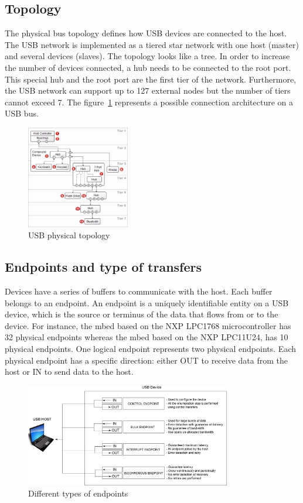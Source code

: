 \documentclass[pdftex,10pt,a4paper]{report}
\begin{document}
\subsection{Topology}
The physical bus topology defines how USB devices are connected to the host. The USB network is implemented as a tiered star network with one host (master) and several devices (slaves). The topology looks like a tree. In order to increase the number of devices connected, a hub needs to be connected to the root port. This special hub and the root port are the first tier of the network. Furthermore, the USB network can support up to 127 external nodes but the number of tiers cannot exceed 7. The figure~\ref{USB physical topology} represents a possible connection architecture on a USB bus.


\begin{figure}[h!]
		\centering
		\includegraphics[width=0.4\textwidth]{./usb_topology.jpg}
		\caption{USB physical topology \footnotemark}
		\label{USB physical topology}
\end{figure}
\subsection{Endpoints and type of transfers}
Devices have a series of buffers to communicate with the host. Each buffer belongs to an endpoint. An endpoint is a uniquely identifiable entity on a USB device, which is the source or terminus of the data that flows from or to the device. For instance, the mbed based on the NXP LPC1768 microcontroller has 32 physical endpoints whereas the mbed based on the NXP LPC11U24, has 10 physical endpoints. One logical endpoint represents two physical endpoints. Each physical endpoint has a specific direction: either OUT to receive data from the host or IN to send data to the host. 



\begin{figure}[h!]
		\centering
		\includegraphics[width=0.8\textwidth]{./endpoints.jpg}
		\caption{Different types of endpoints}
		\label{Different types of endpoints}
\end{figure}
\end{document}
